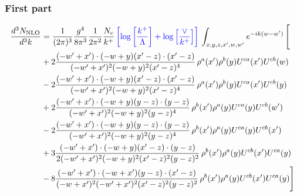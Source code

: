 \documentclass[aps,prd,amsmath,amssymb,nofootinbib]{revtex4-2}
\numberwithin{equation}{section}
\begin{document}
\subsubsection{First part}
\begin{align}
    \frac{d^{3}N_{\rm NLO}}{d^{3}k} & = \frac{1}{(2\pi)^{3}}\frac{g^{4}}{8\pi^{3}}\frac{1}{2\pi^{2}} \frac{N_{c}}{k^{+}}\,{\color{blue}\left[\log{\left[\frac{k^{+}}{\Lambda}\right]}+\log{\left[\frac{\vee}{k^{+}}\right]}\right]}\,\int_{x,y,z,x^{\prime},w,w^{\prime}}e^{-ik(w-w^{\prime})}\, \Bigg[\notag \\ &  + 2 \frac{( - w' + x') \cdot ( - w + y) (x' - z) \cdot (x' - z)}{( - w' + x')^{2} ( - w + y)^{2} (x' - z)^{4}}\,\rho^{a}(x') \rho^{b}(y) U^{c a}(x') U^{c b}(w)\nonumber\\
    &- 2 \frac{( - w' + x') \cdot ( - w + y) (x' - z) \cdot (x' - z)}{( - w' + x')^{2} ( - w + y)^{2} (x' - z)^{4}}\,\rho^{a}(x') \rho^{b}(y) U^{c a}(x') U^{c b}(y)\nonumber\\
        &+ 2 \frac{( - w' + x') \cdot ( - w + y) (y - z) \cdot (y - z)}{( - w' + x')^{2} ( - w + y)^{2} (y - z)^{4}}\,\rho^{b}(x') \rho^{a}(y) U^{c a}(y) U^{c b}(w')\nonumber\\
    &-2\frac{( - w' + x') \cdot ( - w + y) (y - z) \cdot (y - z)}{( - w' + x')^{2} ( - w + y)^{2} (y - z)^{4}}\,\rho^{b}(x') \rho^{a}(y) U^{c a}(y) U^{c b}(x')\nonumber\\
    &+ 3 \frac{( - w' + x') \cdot ( - w + y) (x' - z) \cdot (y - z)}{2 ( - w' + x')^{2} ( - w + y)^{2} (x' - z)^{2} (y - z)^{2}}\,\rho^{b}(x') \rho^{a}(y) U^{cb}(x') U^{ca}(y) \nonumber\\
    &- 8 \frac{( - w' + x') \cdot ( - w + x') (y - z) \cdot (x' - z)}{( - w + x')^{2} ( - w' + x')^{2} (x' - z)^{2} (y - z)^{2}}\,\rho^{b}(x') \rho^{a}(y) U^{cb}(x') U^{c a}(y) \Bigg]
\end{align}
\end{document}
